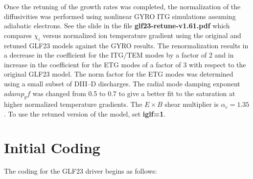 Once the retuning of the growth rates was completed, the
normalization of the diffusivities was performed using
nonlinear GYRO ITG simulations assuming adiabatic electrons.
See the slide in the file {\bf glf23-retune-v1.61.pdf}
which compares $\chi_i$ versus normalized ion temperature
gradient using the original and retuned GLF23 models
against the GYRO results. The renormalization
results in a decrease in the coefficient for the ITG/TEM
modes by a factor of 2 and in increase in the coefficient
for the ETG modes of a factor of 3 with respect to the
original GLF23 model. The norm factor for the ETG modes
was determined using a small subset of DIII--D discharges.
The radial mode damping exponent $adamp_gf$ was changed from 
0.5 to 0.7 to give a better fit to the saturation at higher 
normalized temperature gradients. The $E\times B$ shear 
multiplier is $\alpha_e=1.35$. To use the retuned version 
of the model, set {\bf iglf=1}.


\section{Initial Coding}

The coding for the GLF23 driver begins as follows:


